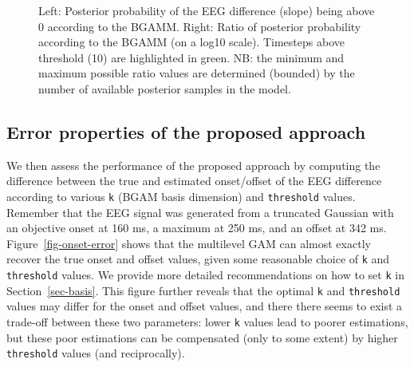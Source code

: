 \documentclass[
  man,
  floatsintext,
  longtable,
  a4paper,
  nolmodern,
  notxfonts,
  notimes,
  colorlinks=true,linkcolor=blue,citecolor=blue,urlcolor=blue]{apa7}
\begin{document}
\begin{figure}[!htb]

\caption{\label{fig-post-prob-ratio}Left: Posterior probability of the
EEG difference (slope) being above 0 according to the BGAMM. Right:
Ratio of posterior probability according to the BGAMM (on a log10
scale). Timesteps above threshold (10) are highlighted in green. NB: the
minimum and maximum possible ratio values are determined (bounded) by
the number of available posterior samples in the model.}


\end{figure}%

\newpage

\subsection{Error properties of the proposed
approach}\label{error-properties-of-the-proposed-approach}

We then assess the performance of the proposed approach by computing the
difference between the true and estimated onset/offset of the EEG
difference according to various \texttt{k} (BGAM basis dimension) and
\texttt{threshold} values. Remember that the EEG signal was generated
from a truncated Gaussian with an objective onset at 160 ms, a maximum
at 250 ms, and an offset at 342 ms. Figure~\ref{fig-onset-error} shows
that the multilevel GAM can almost exactly recover the true onset and
offset values, given some reasonable choice of \texttt{k} and
\texttt{threshold} values. We provide more detailed recommendations on
how to set \texttt{k} in Section~\ref{sec-basis}. This figure further
reveals that the optimal \texttt{k} and \texttt{threshold} values may
differ for the onset and offset values, and there there seems to exist a
trade-off between these two parameters: lower \texttt{k} values lead to
poorer estimations, but these poor estimations can be compensated (only
to some extent) by higher \texttt{threshold} values (and reciprocally).
\end{document}
